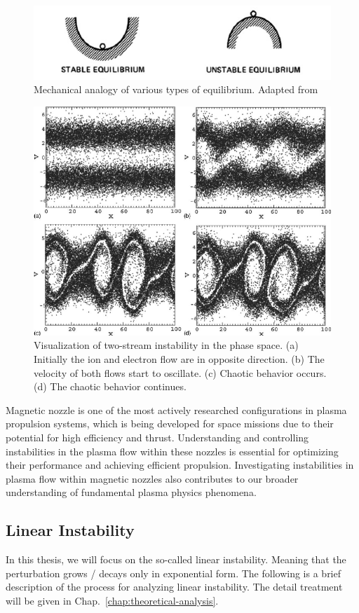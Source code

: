 \begin{figure}[htbp]
	\centering
	\includegraphics[width=0.7\linewidth]{figures/stability-visualization.png}
	\caption{Mechanical analogy of various types of equilibrium. Adapted from \cite{chen_introduction_2016}}
	\label{fig:stability-visualization}
\end{figure}

\begin{figure}[htbp]
	\centering
	\includegraphics[width=0.7\linewidth]{figures/two-stream-instability}
	\caption{Visualization of two-stream instability in the phase space. (a) Initially the ion and electron flow are in opposite direction. (b) The velocity of both flows start to oscillate. (c) Chaotic behavior occurs. (d) The chaotic behavior continues. \cite{ha_nonlinear_2011}}
	\label{fig:two-stream-instability}
\end{figure}

Magnetic nozzle is one of the most actively researched configurations in plasma propulsion systems, which is being developed for space missions due to their potential for high efficiency and thrust. Understanding and controlling instabilities in the plasma flow within these nozzles is essential for optimizing their performance and achieving efficient propulsion. Investigating instabilities in plasma flow within magnetic nozzles also contributes to our broader understanding of fundamental plasma physics phenomena.


\subsection*{Linear Instability}
In this thesis, we will focus on the so-called linear instability. Meaning that the perturbation grows / decays only in exponential form. The following is a brief description of the process for analyzing linear instability. The detail treatment will be given in Chap.~\ref{chap:theoretical-analysis}.

